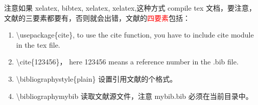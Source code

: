 \documentclass[UTF8,fancyhdr,a4paper]{ctexart}
\begin{document}
注意如果 xelatex, bibtex, xelatex, xelatex,这种方式 compile tex 文档，要注意，文献的三要素都要有，否则就会出错，文献的\textcolor{red}{四要素}包括：
\begin{enumerate}
    \item \textbackslash usepackage\{cite\}, to use the cite function, you have to include cite module in the tex file.
    \item \textbackslash cite\{123456\}， here 123456 means a reference number in the .bib file.
    \item \textbackslash bibliographystyle\{plain\} 设置引用文献的个格式。
    \item \textbackslash bibliography{mybib} 读取文献源文件，注意 mybib.bib 必须在当前目录中。
\end{enumerate}



\end{document}
